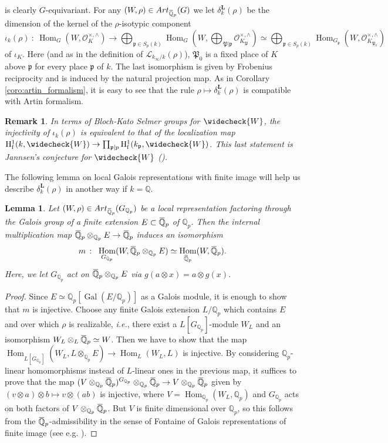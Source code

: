 \documentclass[12pt]{amsart}
\newcommand{\Q}{\mathbb{Q}}
\newcommand\bQ{\mathbb{Q}}
\newcommand\Qp{{\mathbb{Q}_p}}
\newcommand\cO{\mathcal{O}}
\newcommand\gp{\mathfrak{p}}
\newcommand\gP{\mathfrak{P}}
\newcommand\sL{\mathscr{L}}
\newcommand{\ob}[1]{\mkern 1.5mu\overline{\mkern-1.5mu#1\mkern-1.5mu}\mkern 1.5mu}
\newcommand{\Art}{\textrm{Art}}
\DeclareMathOperator{\Gal}{Gal}
\DeclareMathOperator{\Hom}{Hom}
\newcommand{\HH}{\mathrm{H}}
\newcommand{\ff}{\mathrm{f}}
\theoremstyle{defstyle}
\newtheorem{remark}[subsubsection]{Remark}
\theoremstyle{thmstyle}
\newtheorem{lemme}[subsubsection]{Lemma}
\begin{document}
	is clearly $G$-equivariant. For any $(W,\rho)\in \Art_{\ob{\bQ}_p}(G)$ we let $\delta^\textbf{L}_k(\rho)$ be the dimension of the kernel of the $\rho$-isotypic component 
	\begin{equation}\label{eq:leopoldts_map_rho}
		\iota_k(\rho)\ \colon\ \Hom_G(W,\cO_K^{\times,\wedge}) \longrightarrow \bigoplus_{\gp\in S_p(k)} \Hom_G(W,\bigoplus_{\gP|\gp} \cO_{K_\gP}^{\times,\wedge}) \simeq \bigoplus_{\gp\in S_p(k)} \Hom_{G_\gp}(W,\cO_{K_{\gP_0}}^{\times,\wedge})
	\end{equation}
	of $\iota_K$. Here (and as in the definition of $\sL_{k_\infty/k}(\rho)$), $\gP_0$ is a fixed place of $K$ above $\gp$ for every place $\gp$ of $k$. The last isomorphism is given by Frobenius reciprocity and is induced by the natural projection map. As in Corollary \ref{coro:artin_formalism}, it is easy to see that the rule $\rho \mapsto \delta^\textbf{L}_k(\rho)$ is compatible with Artin formalism.
	\begin{remark}
		In terms of Bloch-Kato Selmer groups for $\widecheck{W}$, the injectivity of $\iota_k(\rho)$ is equivalent to that of the localization map $\HH^1_\ff(k,\widecheck{W}) \rightarrow \prod_{\gp|p} \HH^1_\ff(k_\gp,\widecheck{W})$. This last statement is Jannsen's conjecture for $\widecheck{W}$ (\cite{jannsen}).
	\end{remark}
	The following lemma on local Galois representations with finite image will help us describe $\delta^\textbf{L}_k(\rho)$ in another way if $k=\Q$. 
	\begin{lemme}\label{lem:fontaine}
		Let $(W,\rho)\in\Art_{\ob{\bQ}_p}(G_{\Qp})$ be a local representation factoring through the Galois group of a finite extension $E \subset \ob{\Q}_p$ of $\Qp$. Then the internal multiplication map $\ob{\Q}_p \otimes_{\Qp} E \rightarrow \ob{\Q}_p$ induces an isomorphism
		$$m \ \colon\ \Hom_{G_{\Qp}}(W,\ob{\Q}_p \otimes_{\Qp} E) \simeq \Hom_{\ob{\bQ}_p}(W,\ob{\Q}_p).$$
		Here, we let $G_{\Qp}$ act on $\ob{\Q}_p \otimes_{\Qp} E$ via $g(a\otimes x)=a\otimes g(x)$.
	\end{lemme}
	\begin{proof}
		Since $E\simeq \Qp[\Gal(E/\Qp)]$ as a Galois module, it is enough to show that $m$ is injective. Choose any finite Galois extension $L/\Qp$ which contains $E$ and over which $\rho$ is realizable, \textit{i.e.}, there exist a $L[G_{\Qp}]$-module $W_L$ and an isomorphism $W_L \otimes_L \ob{\Q}_p \simeq W$. Then we have to show that the map $\Hom_{L[G_{\Qp}]}(W_L, L \otimes_{\Qp} E) \to \Hom_{L}(W_L,L)$ is injective. By considering $\Qp$-linear homomorphisms instead of $L$-linear ones in the previous map, it suffices to prove that the map $(V \otimes_{\Qp} \ob{\Q}_p)^{G_{\Qp}} \otimes_{\Qp} \ob{\Q}_p \to V \otimes_{\Qp} \ob{\Q}_p$ given by $(v\otimes a)\otimes b \mapsto v \otimes (ab)$ is injective, where $V=\Hom_{\Qp}(W_L,\Qp)$ and $G_{\Qp}$ acts on both factors of $V \otimes_{\Qp} \ob{\Q}_p$. But $V$ is finite dimensional over $\Qp$, so this follows from the $\ob{\Q}_p$-admissibility in the sense of Fontaine of Galois representations of finite image (see e.g. \cite[Proposition 2.7]{fontaineouyang}).
	\end{proof}
	
\end{document}
